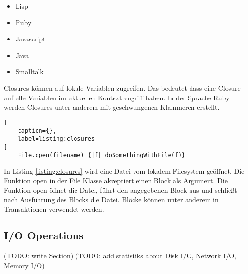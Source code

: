 \begin{itemize}
  \item Lisp
  \item Ruby
  \item Javascript
  \item Java
  \item Smalltalk
\end{itemize}

Closures können auf lokale Variablen zugreifen. Das bedeutet dass eine Closure auf alle Variablen im aktuellen Kontext zugriff haben. In der Sprache Ruby werden Closures unter anderem mit geschwungenen Klammeren erstellt. \cite[]{fow04} 

\begin{lstlisting}[
	caption={},
	label=listing:closures
]
	File.open(filename) {|f| doSomethingWithFile(f)}
\end{lstlisting}
\cite[]{fow04}

In Listing \ref{listing:closures} wird eine Datei vom lokalem Filesystem geöffnet. Die Funktion open in der File Klasse akzeptiert einen Block als Argument. Die Funktion open öffnet die Datei, führt den angegebenen Block aus und schließt nach Ausführung des Blocks die Datei. Blöcke können unter anderem in Transaktionen verwendet werden. \cite[]{fow04}


\subsection{I/O Operations}
(TODO: write Section)
(TODO: add statistiks about Disk I/O, Network I/O, Memory I/O)